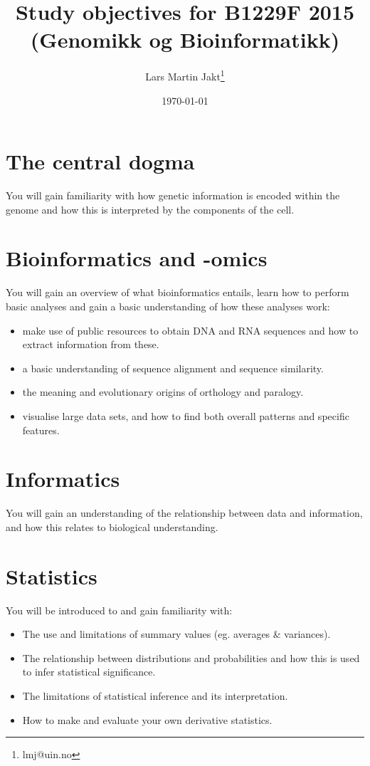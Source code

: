 \documentclass{scrartcl}
\title{Study objectives for B1229F 2015 (Genomikk og Bioinformatikk)}
\author{Lars Martin Jakt\thanks{lmj@uin.no}}
\date{\today}
\begin{document}
\maketitle


\section{The central dogma}
\label{sec-1}

You will gain familiarity with how genetic information is encoded within
the genome and how this is interpreted by the components of the cell.
\section{Bioinformatics and -omics}
\label{sec-2}

You will gain an overview of what bioinformatics entails, learn how to
perform basic analyses and gain a basic understanding of how these analyses
work: 
\begin{itemize}
\item make use of public resources to 
  obtain DNA and RNA sequences and how to extract information
  from these.
\item a basic understanding of sequence alignment and sequence similarity.
\item the meaning and evolutionary origins of orthology and paralogy.
\item visualise large data sets, and how to
  find both overall patterns and specific features.
\end{itemize}
\section{Informatics}
\label{sec-3}

You will gain an understanding of the relationship between data and information,
and how this relates to biological understanding.
\section{Statistics}
\label{sec-4}

You will be introduced to and gain familiarity with:
\begin{itemize}
\item The use and limitations of summary values (eg. averages \& variances).
\item The relationship between distributions and probabilities
  and how this is used to infer statistical significance.
\item The limitations of statistical inference and
  its interpretation.
\item How to make and evaluate your own derivative statistics.
\end{itemize}
\end{document}

